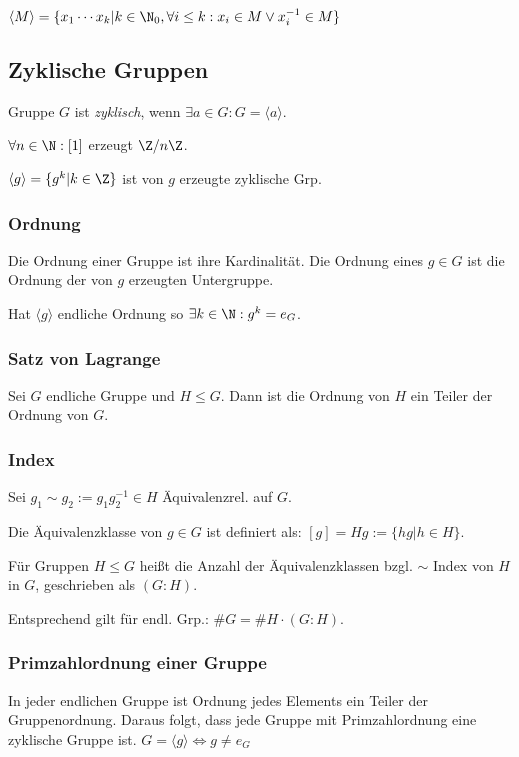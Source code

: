 $\langle M \rangle = \{ x_1 \cdots x_k | k \in \N_0, \forall i \leq k : x_i \in M \lor x_i^{-1} \in M \}$

\subsection*{Zyklische Gruppen}

Gruppe $G$ ist \emph{zyklisch}, wenn $\exists a \in G : G = \langle a \rangle$.

$\forall n \in \N : [1]$ erzeugt $\Z / n\Z$.

$\langle g \rangle = \{ g^k | k \in \Z \}$ ist von $g$ erzeugte zyklische Grp.

\subsubsection*{Ordnung}

Die Ordnung einer Gruppe ist ihre Kardinalität. Die Ordnung eines $g \in G$ ist die Ordnung der von $g$ erzeugten Untergruppe.

Hat $\langle g \rangle$ endliche Ordnung so $\exists k \in \N : g^k = e_G$.

\subsubsection*{Satz von Lagrange}

Sei $G$ endliche Gruppe und $H \leq G$. Dann ist die Ordnung von $H$ ein Teiler der Ordnung von $G$.

\subsubsection*{Index}

Sei $g_1 \sim g_2 := g_1 g_2^{-1} \in H$ Äquivalenzrel. auf $G$.

Die Äquivalenzklasse von $g \in G$ ist definiert als: $[g] = Hg := \{ hg | h \in H\}$.

Für Gruppen $H \leq G$ heißt die Anzahl der Äquivalenzklassen bzgl. $\sim$ Index von $H$ in $G$, geschrieben als $(G : H)$.

Entsprechend gilt für endl. Grp.: $\#G = \#H \cdot (G : H)$.

\subsubsection*{Primzahlordnung einer Gruppe}

In jeder endlichen Gruppe ist Ordnung jedes Elements ein Teiler der Gruppenordnung. Daraus folgt, dass jede Gruppe mit Primzahlordnung eine zyklische Gruppe ist. $G = \langle g \rangle \iff g \neq e_G$

